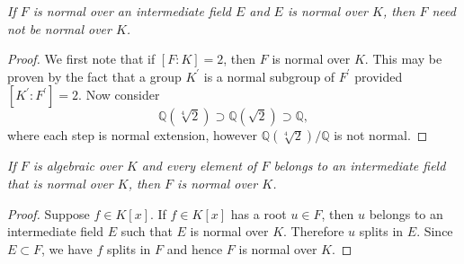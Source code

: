 \begin{problem}\em
If $F$ is normal over an intermediate field $E$ and $E$ is normal over $K$, then $F$ need not be normal over $K$.
\end{problem}
\begin{proof}
We first note that if $[F:K]=2$, then $F$ is normal over $K$. This may be proven by the fact that a group $K^\prime$ is a normal subgroup of $F^\prime$ provided $[K^\prime:F^\prime]=2$. Now consider 
$$
\mathbb{Q} \left( \sqrt[4]{2} \right) \supset \mathbb{Q} \left( \sqrt{2} \right) \supset \mathbb{Q} ,
$$
where each step is normal extension, however $\mathbb{Q}(\sqrt[4]{2})/\mathbb{Q}$ is not normal.
\end{proof}
\begin{problem}\em
If $F$ is algebraic over $K$ and every element of $F$ belongs to an intermediate field that is normal over $K$, then $F$ is normal over $K$.
\end{problem}
\begin{proof}
Suppose $f\in K[x]$. If $f\in K[x]$ has a root $u\in F$, then $u$ belongs to an intermediate field $E$ such that $E$ is normal over $K$. Therefore $u$ splits in $E$. Since $E\subset F$, we have $f$ splits in $F$ and hence $F$ is normal over $K$.
\end{proof}
